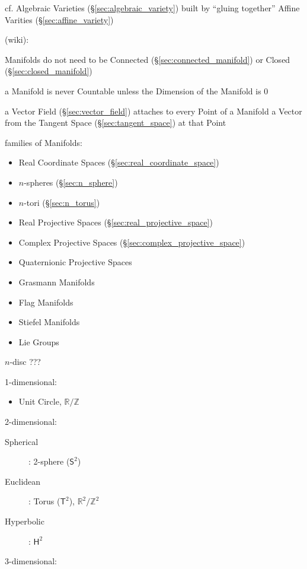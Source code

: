 cf. Algebraic Varieties (\S\ref{sec:algebraic_variety}) built by ``gluing
together'' Affine Varities (\S\ref{sec:affine_variety})

(wiki):

Manifolds do not need to be Connected (\S\ref{sec:connected_manifold}) or
Closed (\S\ref{sec:closed_manifold})

a Manifold is never Countable unless the Dimension of the Manifold is $0$

a Vector Field (\S\ref{sec:vector_field}) attaches to every Point of a Manifold
a Vector from the Tangent Space (\S\ref{sec:tangent_space}) at that Point

families of Manifolds:
\begin{itemize}
  \item Real Coordinate Spaces (\S\ref{sec:real_coordinate_space})
  \item $n$-spheres (\S\ref{sec:n_sphere})
  \item $n$-tori (\S\ref{sec:n_torus})
  \item Real Projective Spaces (\S\ref{sec:real_projective_space})
  \item Complex Projective Spaces (\S\ref{sec:complex_projective_space})
  \item Quaternionic Projective Spaces
  \item Grasmann Manifolds
  \item Flag Manifolds
  \item Stiefel Manifolds
  \item Lie Groups
\end{itemize}

$n$-disc ??? %

1-dimensional:

\begin{itemize}
  \item Unit Circle, $\mathbb{R}/\mathbb{Z}$
\end{itemize}

2-dimensional:

\begin{description}
  \item [Spherical]: 2-sphere ($\mathsf{S}^2$)
  \item [Euclidean]: Torus ($\mathsf{T}^2$),
  $\mathbb{R}^2/\mathbb{Z}^2$
  \item [Hyperbolic]: $\mathsf{H}^2$
\end{description}

3-dimensional:

